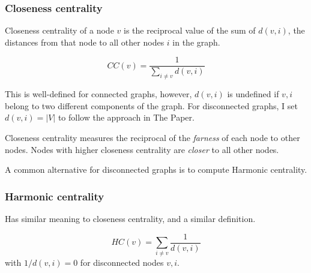 \subsubsection{Closeness centrality}

Closeness centrality of a node $v$ is the reciprocal value of the sum of $d(v, i)$, the distances from that node to all other nodes $i$ in the graph.

\begin{definition}
    \[CC(v) = \frac{1}{\sum_{i \neq v} d(v, i)}\]
\end{definition}

This is well-defined for connected graphs, however, $d(v, i)$ is undefined if $v, i$ belong to two different components of the graph.
For disconnected graphs, I set $d(v, i) = |V|$ to follow the approach in The Paper.

Closeness centrality measures the reciprocal of the \textsl{farness} of each node to other nodes.
Nodes with higher closeness centrality are \textsl{closer} to all other nodes.

A common alternative for disconnected graphs is to compute Harmonic centrality.



\subsubsection{Harmonic centrality}

Has similar meaning to closeness centrality, and a similar definition.

\begin{definition}
    \[HC(v) = \sum_{i \neq v} \frac{1}{d(v, i)}\]
    with $1 / d(v, i) = 0$ for disconnected nodes $v, i$.
\end{definition}

%
%
%

